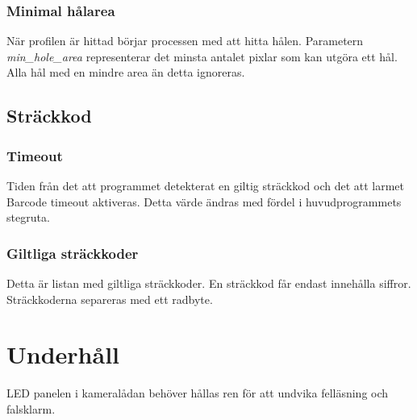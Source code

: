 \documentclass[a4paper]{article}
\begin{document}
	  \subsubsection{Minimal hålarea}
	  	När profilen är hittad börjar processen med att hitta hålen. Parametern \textit{min\_hole\_area} representerar det minsta antalet pixlar 
	  	som kan utgöra ett hål.
		Alla hål med en mindre area än detta ignoreras.

	\subsection{Sträckkod}\label{subsec:barcode}
	  \subsubsection{Timeout}
	  	Tiden från det att programmet detekterat en giltig sträckkod och det att larmet Barcode timeout aktiveras. Detta värde ändras med fördel i huvudprogrammets stegruta.

	  \subsubsection{Giltliga sträckkoder}
	  	Detta är listan med giltliga sträckkoder. En sträckkod får endast innehålla siffror. Sträckkoderna separeras med ett radbyte.

\section{Underhåll}
	LED panelen i kameralådan behöver hållas ren för att undvika felläsning och falsklarm.
\end{document}
